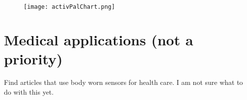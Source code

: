 \begin{figure}[h!]
	\centering
		\texttt{[image: activPalChart.png]}
		\caption{\footnotesize }
		\label{fig:activPalActivityBreakdown}
\end{figure}

\section{Medical applications (not a priority)}
Find articles that use body worn sensors for health care. I am not sure what to do with this yet.
